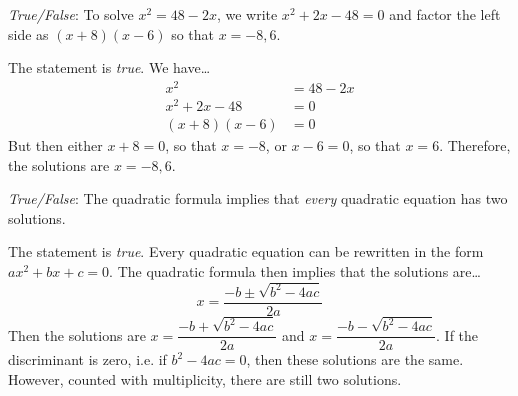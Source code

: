 \documentclass[11pt,letterpaper]{article}
\begin{document}
\quizsol \textit{True/False}: To solve $x^2= 48 - 2x$, we write $x^2 + 2x - 48= 0$ and factor the left side as $(x + 8)(x - 6)$ so that $x= -8, 6$. \pspace

\sol The statement is \textit{true}. We have\dots
	\[
	\begin{aligned}
	x^2&= 48 - 2x \\
	x^2 + 2x - 48&= 0 \\
	(x + 8)(x - 6)&= 0 
	\end{aligned}
	\]
But then either $x + 8= 0$, so that $x= -8$, or $x - 6=0$, so that $x= 6$. Therefore, the solutions are $x= -8, 6$. \pvspace{1cm}



\quizsol \textit{True/False}: The quadratic formula implies that \textit{every} quadratic equation has two solutions. \pspace

\sol The statement is \textit{true}. Every quadratic equation can be rewritten in the form $ax^2 + bx + c= 0$. The quadratic formula then implies that the solutions are\dots
	\[
	x= \dfrac{-b \pm \sqrt{b^2 - 4ac}}{2a}
	\]
Then the solutions are $x= \dfrac{-b + \sqrt{b^2 - 4ac}}{2a}$ and $x= \dfrac{-b - \sqrt{b^2 - 4ac}}{2a}$. If the discriminant is zero, i.e. if $b^2 - 4ac= 0$, then these solutions are the same. However, counted with multiplicity, there are still two solutions. 



\newpage
\end{document}
